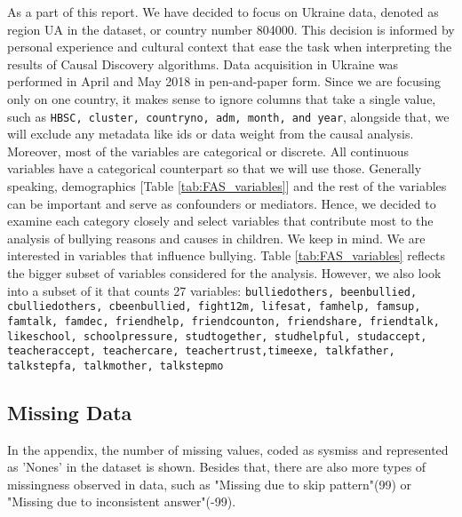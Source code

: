 \documentclass[main.tex]{subfiles}
\begin{document}


As a part of this report. We have decided to focus on Ukraine data, denoted as region UA in the dataset, or country number 804000. This decision is informed by personal experience and cultural context that ease the task when interpreting the results of Causal Discovery algorithms. 
Data acquisition in Ukraine was performed in April and May 2018 in pen-and-paper form. Since we are focusing only on one country, it makes sense to ignore columns that take a single value, such as \texttt{HBSC, cluster, countryno, adm, month, and year}, alongside that, we will exclude any metadata like ids or data weight from the causal analysis. Moreover, most of the variables are categorical or discrete. All continuous variables have a categorical counterpart so that we will use those. 
Generally speaking, demographics [Table \ref{tab:FAS_variables}] and the rest of the variables can be important and serve as confounders or mediators. Hence, we decided to examine each category closely and select variables that contribute most to the analysis of bullying reasons and causes in children. We keep in mind. We are interested in variables that influence bullying. Table \ref{tab:FAS_variables} reflects the bigger subset of variables considered for the analysis. However, we also look into a subset of it that counts 27 variables: \texttt{bulliedothers, beenbullied, cbulliedothers, cbeenbullied, fight12m, lifesat, famhelp, famsup, famtalk, famdec, friendhelp, friendcounton, friendshare, friendtalk, likeschool, schoolpressure, studtogether, studhelpful, studaccept, teacheraccept, teachercare, teachertrust,timeexe, talkfather, talkstepfa, talkmother, talkstepmo}


% 

\subsection{Missing Data}
In the appendix, the number of missing values, coded as sysmiss and represented as 'Nones' in the dataset is shown. Besides that, there are also more types of missingness observed in data, such as "Missing due to skip pattern"(99) or "Missing due to inconsistent answer"(-99).

% 



% 
\end{document}
